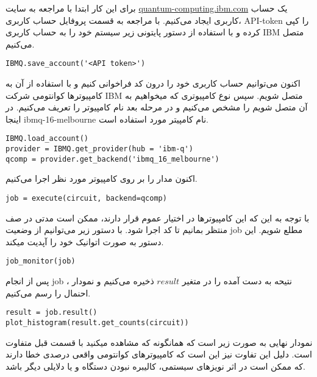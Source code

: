 \documentclass[a4paper,11pt,oneside,openany]{iut-thesis}
\begin{document}
 برای این کار ابتدا با مراجعه به سایت  \url{quantum-computing.ibm.com} یک حساب کاربری ایجاد می‌کنیم. با مراجعه به قسمت پروفایل حساب کاربری، API-token را کپی کرده و با استفاده از دستور پایتونی زیر سیستم خود را به حساب کاربری IBM متصل می‌کنیم.
\begin{latin}
\begin{lstlisting}[style=Mypython]
IBMQ.save_account('<API token>')
\end{lstlisting}
\end{latin}

اکنون می‌توانیم حساب کاربری خود را درون کد فراخوانی کنیم و با استفاده از آن به کامپیوترها کوانتومی شرکت IBM متصل شویم. سپس نوع کامپیوتری که میخواهیم به آن متصل شویم را مشخص می‌کنیم و در مرحله بعد نام کامپیوتر را تعریف می‌کنیم. در اینجا ibmq-16-melbourne  نام کامپیتر مورد استفاده است. 
\begin{latin}
\begin{lstlisting}[style=Mypython]
IBMQ.load_account()
provider = IBMQ.get_provider(hub = 'ibm-q')
qcomp = provider.get_backend('ibmq_16_melbourne')
\end{lstlisting}
\end{latin}

اکنون مدار را بر روی کامپیوتر مورد نظر اجرا می‌کنیم.  
\begin{latin}
\begin{lstlisting}[style=Mypython]
job = execute(circuit, backend=qcomp)
\end{lstlisting}
\end{latin}
با توجه به این که این کامپیوترها در اختیار عموم قرار دارند، ممکن است مدتی در صف منتظر بمانیم تا کد اجرا شود. با دستور زیر می‌توانیم از وضعیت job مطلع شویم. این دستور به صورت اتوانیک خود را آپدیت میکند.

\begin{latin}
\begin{lstlisting}[style=Mypython]
job_monitor(job)
\end{lstlisting}
\end{latin}

پس از انجام job ، نتیحه به دست آمده را در متغیر $result$ ذخیره می‌کنیم و نمودار احنمال را رسم می‌کنیم.
\begin{latin}
\begin{lstlisting}[style=Mypython]
result = job.result()
plot_histogram(result.get_counts(circuit))
\end{lstlisting}
\end{latin}

نمودار نهایی به صورت زیر است که همانگونه که مشاهده میکنید با قسمت قبل متفاوت است. دلیل این تفاوت نیز این است که کامپیوترهای کوانتومی واقعی درصدی خطا دارند که ممکن است در اثر نویزهای سیستمی، کالیبره نبودن دستگاه و یا دلایلی دیگر باشد.
\end{document}
